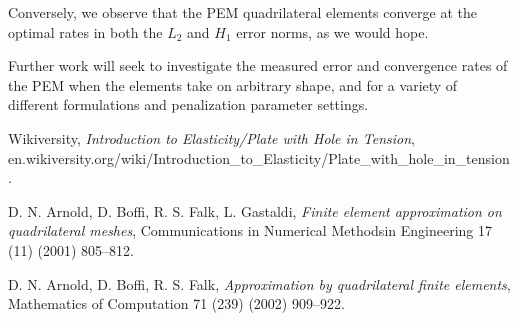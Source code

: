 \documentclass[12pt]{article}
\begin{document}
Conversely, we observe that the PEM quadrilateral elements converge at the optimal rates in both the $L_2$ and $H_1$ error norms, as we would hope.

Further work will seek to investigate the measured error and convergence rates of the PEM when the elements take on arbitrary shape, and for a variety of different formulations and penalization parameter settings.

\begin{thebibliography}{9}
Wikiversity,
\textit{Introduction to Elasticity/Plate with Hole in Tension},
en.wikiversity.org/wiki/Introduction\_to\_Elasticity/Plate\_with\_hole\_in\_tension.
 
D. N. Arnold, D. Boffi, R. S. Falk, L. Gastaldi,
\textit{Finite element approximation on quadrilateral meshes},
Communications in Numerical Methodsin Engineering 17 (11) (2001) 805–812.

D. N. Arnold, D. Boffi, R. S. Falk,
\textit{Approximation by quadrilateral finite elements},
Mathematics of Computation 71 (239) (2002) 909–922.
\end{thebibliography}
\end{document}
